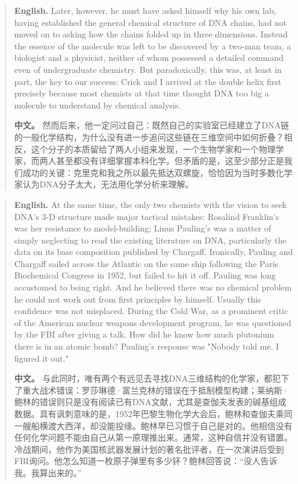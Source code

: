 \begin{quote}
\noindent\textbf{English.} Later, however, he must have asked himself why his own lab, having established the general chemical structure of DNA chains, had not moved on to asking how the chains folded up in three dimensions. Instead the essence of the molecule was left to be discovered by a two-man team, a biologist and a physicist, neither of whom possessed a detailed command even of undergraduate chemistry. But paradoxically, this was, at least in part, the key to our success: Crick and I arrived at the double helix first precisely because most chemists at that time thought DNA too big a molecule to understand by chemical analysis.

\smallskip
\noindent\textbf{中文。} 然而后来，他一定问过自己：既然自己的实验室已经建立了DNA链的一般化学结构，为什么没有进一步追问这些链在三维空间中如何折叠？相反，这个分子的本质留给了两人小组来发现，一个生物学家和一个物理学家，而两人甚至都没有详细掌握本科化学。但矛盾的是，这至少部分正是我们成功的关键：克里克和我之所以最先抵达双螺旋，恰恰因为当时多数化学家认为DNA分子太大，无法用化学分析来理解。
\end{quote}

\begin{quote}
\noindent\textbf{English.} At the same time, the only two chemists with the vision to seek DNA's 3-D structure made major tactical mistakes: Rosalind Franklin's was her resistance to model-building; Linus Pauling's was a matter of simply neglecting to read the existing literature on DNA, particularly the data on its base composition published by Chargaff. Ironically, Pauling and Chargaff sailed across the Atlantic on the same ship following the Paris Biochemical Congress in 1952, but failed to hit it off. Pauling was long accustomed to being right. And he believed there was no chemical problem he could not work out from first principles by himself. Usually this confidence was not misplaced. During the Cold War, as a prominent critic of the American nuclear weapons development program, he was questioned by the FBI after giving a talk. How did he know how much plutonium there is in an atomic bomb? Pauling's response was "Nobody told me. I figured it out."

\smallskip
\noindent\textbf{中文。} 与此同时，唯有两个有远见去寻找DNA三维结构的化学家，都犯下了重大战术错误：罗莎琳德·富兰克林的错误在于抵制模型构建；莱纳斯·鲍林的错误则只是没有阅读已有DNA文献，尤其是查伽夫发表的碱基组成数据。具有讽刺意味的是，1952年巴黎生物化学大会后，鲍林和查伽夫乘同一艘船横渡大西洋，却没能投缘。鲍林早已习惯于自己是对的。他相信没有任何化学问题不能由自己从第一原理推出来。通常，这种自信并没有错置。冷战期间，他作为美国核武器发展计划的著名批评者，在一次演讲后受到FBI询问。他怎么知道一枚原子弹里有多少钚？鲍林回答说：“没人告诉我。我算出来的。”
\end{quote}

